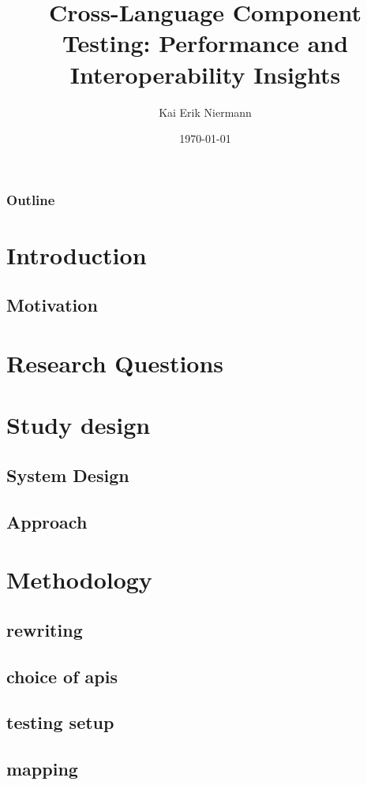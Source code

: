 \documentclass{beamer}
\title{Cross-Language Component Testing: Performance and Interoperability Insights}
\author{Kai Erik Niermann}
\date{\today}
\begin{document}
\frame{\titlepage}

\begin{frame}
\frametitle{Outline}
\tableofcontents
\end{frame}

\section{Introduction}

\subsection{Motivation}
 

\section{Research Questions}


\section{Study design}
\subsection{System Design}

\subsection{Approach}


\section{Methodology}
\subsection{rewriting}

\subsection{choice of apis}

\subsection{testing setup}


\subsection{mapping}



\end{document}
